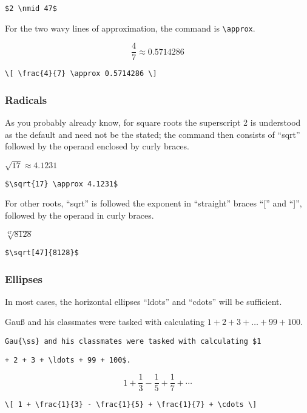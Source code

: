 \smallskip

\verb'$2 \nmid 47$'

\bigskip

For the two wavy lines of approximation, the command is \verb=\approx=.

\[ \frac{4}{7} \approx 0.5714286 \]

\verb'\[ \frac{4}{7} \approx 0.5714286 \]'

\subsubsection{Radicals}

As you probably already know, for square roots the superscript 2 is understood as the default and need not be the stated; the command then consists of ``sqrt'' followed by the operand enclosed by curly braces.

\medskip

$\sqrt{17} \approx 4.1231$

\smallskip

\verb'$\sqrt{17} \approx 4.1231$'

\bigskip

For other roots, ``sqrt'' is followed the exponent in ``straight'' braces ``['' and ``]'', followed by the operand in curly braces.

\medskip

$\sqrt[47]{8128}$

\smallskip

\verb'$\sqrt[47]{8128}$'

\bigskip

\subsubsection{Ellipses}

In most cases, the horizontal ellipses ``ldots'' and ``cdots'' will be sufficient.

\medskip

Gau{\ss} and his classmates were tasked with calculating $1 + 2 + 3 + \ldots + 99 + 100$.

\smallskip

\verb'Gau{\ss} and his classmates were tasked with calculating $1'

\verb'+ 2 + 3 + \ldots + 99 + 100$.'

\[ 1 + \frac{1}{3} - \frac{1}{5} + \frac{1}{7} + \cdots \]

\verb'\[ 1 + \frac{1}{3} - \frac{1}{5} + \frac{1}{7} + \cdots \]'

